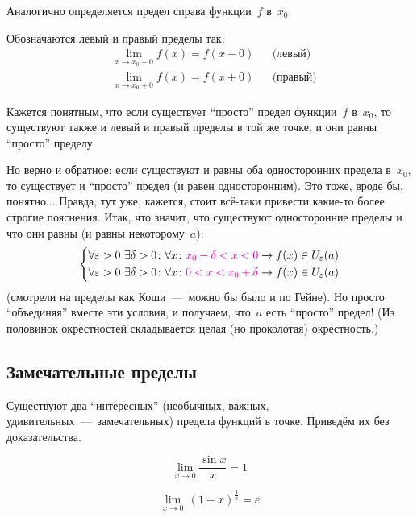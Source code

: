 \documentclass[a4paper,12pt]{article}
\begin{document}
  Аналогично определяется предел справа функции~$f$ в~$x_0$.

  Обозначаются левый и правый пределы так:
  \[
    \begin{aligned}
      &\lim_{x \to x_0 - 0} f(x) = f(x - 0) & &\mbox{(левый)}\\
      &\lim_{x \to x_0 + 0} f(x) = f(x + 0) & &\mbox{(правый)}
    \end{aligned}
  \]

  Кажется понятным, что если существует ``просто'' предел функции~$f$ в~$x_0$, то существуют также и левый и правый пределы в той же точке, и они равны ``просто'' пределу.

  Но верно и обратное: если существуют и равны оба односторонних предела в~$x_0$, то существует и ``просто'' предел (и равен односторонним).
  Это тоже, вроде бы, понятно...
  Правда, тут уже, кажется, стоит всё-таки привести какие-то более строгие пояснения.
  Итак, что значит, что существуют односторонние пределы и что они равны (и равны некоторому~$a$):
  \[
    \left\{\begin{aligned}
      &\forall \eps > 0\ \exists \delta > 0\colon \forall x\colon \textcolor{pink}{x_0 - \delta < x < 0} \to f(x) \in U_{\eps}(a)\\
      &\forall \eps > 0\ \exists \delta > 0\colon \forall x\colon \textcolor{pink}{0 < x < x_0 + \delta} \to f(x) \in U_{\eps}(a)
    \end{aligned}\right.
  \]
  (смотрели на пределы как Коши~---~можно бы было и по Гейне).
  Но просто ``объединяя'' вместе эти условия, и получаем, что~$a$ есть ``просто'' предел!
  (Из половинок окрестностей складывается целая (но проколотая) окрестность.)


  \subsection{Замечательные пределы}

  Существуют два ``интересных'' (необычных, важных, удивительных~---~замечательных) предела функций в точке.
  Приведём их без доказательства.

  \begin{proposition}
    \begin{equation}\label{eq:first-marvelous}
      \lim_{x \to 0} \frac{\sin x}{x} = 1
    \end{equation}
  \end{proposition}

  \begin{proposition}
    \begin{equation}\label{eq:second-marvelous}
      \lim_{x \to 0}\, (1 + x)^{\frac{1}{x}} = e
    \end{equation}
  \end{proposition}
\end{document}

